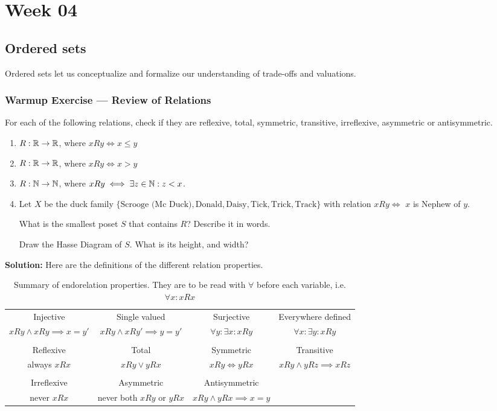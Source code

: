\section{Week 04}
\subsection{Ordered sets}
Ordered sets let us conceptualize and formalize our understanding of trade-offs and valuations.

\subsubsection{Warmup Exercise --- Review of Relations}

For each of the following relations, check if they are reflexive, total, symmetric, transitive, irreflexive, asymmetric or antisymmetric.
\begin{enumerate}
  \item $R: \mathbb{R} \to \mathbb{R}$, where $x R y \iff x \leq y$
  \item $R: \mathbb{R} \to \mathbb{R}$, where $x R y \iff x > y$
  \item $R: \mathbb{N} \to \mathbb{N}$, where $x R y \iff \exists z \in \mathbb{N}: z < x$.
  \item Let $X$ be the duck family $\{\text{Scrooge (Mc Duck)}, \text{Donald}, \text{Daisy}, \text{Tick}, \text{Trick}, \text{Track}\}$ with relation $x R y \iff$ $x$ is Nephew of $y$.

    What is the smallest poset $S$ that contains $R$? Describe it in words. 

    Draw the Hasse Diagram of $S$. What is its height, and width?
\end{enumerate}

\textbf{Solution:}
Here are the definitions of the different relation properties. 
\begin{table}[h]
\begin{tabular}{cccc}
  Injective
  &
  Single valued
  &
  Surjective
  &
  Everywhere defined
  \\
  $x Ry \land x R y \implies x = y'$
  &
  $x R y \land x R y' \implies y = y'$
  &
  $\forall y: \exists x: x Ry$
  &
  $\forall x: \exists y: x Ry$
  \\
  \\
  Reflexive
  & Total 
  & Symmetric
  & Transitive
  \\
  always $x Rx$
  &
  $x R y \lor y R x$
  &
  $x R y \iff y R x$
  &
  $x R y \land y R z \implies x R z$
  \\
  \\
  Irreflexive
  & Asymmetric
  & Antisymmetric
  \\
  never $x R x$
  &
  never both $x R y$ or $y Rx$ 
  &
  $x R y \land y R x \implies x = y$
\end{tabular}
\caption{Summary of endorelation properties.
They are to be read with $\forall$ before each variable, i.e. $\forall x: x R x$}
\end{table}

